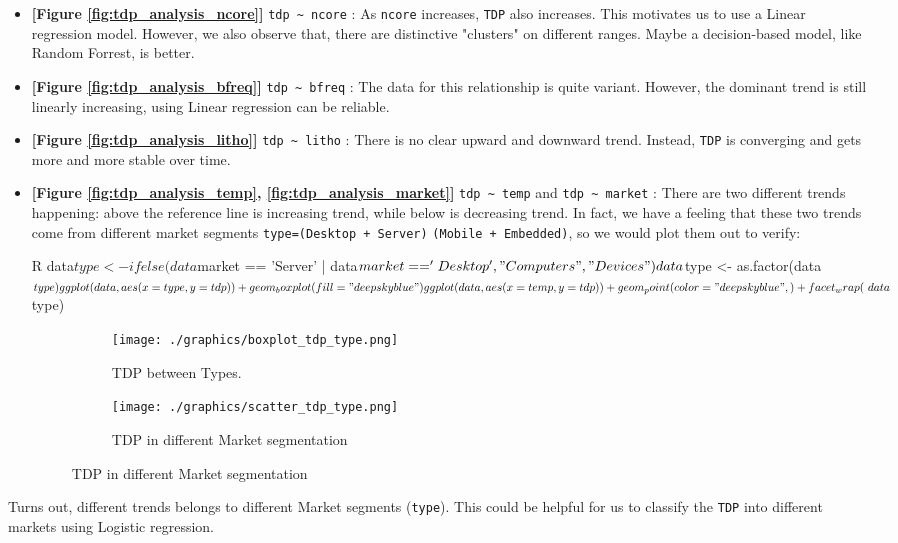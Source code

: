 \begin{itemize}
    \item \textbf{[Figure \ref{fig:tdp_analysis_ncore}]} \verb|tdp ~ ncore| : As \verb|ncore| increases, \verb|TDP| also increases. This motivates us to use 
    a Linear regression model. However, we also observe that, there are distinctive "clusters" on different ranges. Maybe a decision-based model, like Random Forrest,
    is better.
    
    \item \textbf{[Figure \ref{fig:tdp_analysis_bfreq}]} \verb|tdp ~ bfreq| : The data for this relationship is quite variant. However, the dominant trend is still linearly increasing,
    using Linear regression can be reliable.
    
    \item \textbf{[Figure \ref{fig:tdp_analysis_litho}]} \verb|tdp ~ litho| : There is no clear upward and downward trend. Instead, \verb|TDP| is converging and gets more and more stable over time. 
    
    \item \textbf{[Figure \ref{fig:tdp_analysis_temp}, \ref{fig:tdp_analysis_market}]} \verb|tdp ~ temp| and \verb|tdp ~ market| : There are two different trends happening: 
    above the reference line is increasing trend, while below is decreasing trend. In fact, we have a feeling that these two trends come from 
    different market segments \verb|type=(Desktop + Server)| \verb|(Mobile + Embedded)|, so we would plot them out to verify:

        \begin{code}{R}
data$type <- ifelse(data$market == 'Server' | data$market == 'Desktop', "Computers", "Devices")
data$type <- as.factor(data$type)

ggplot(data, aes(x = type, y = tdp)) +
    geom_boxplot(fill = "deepskyblue")
            
ggplot(data, aes(x = temp, y = tdp)) +
    geom_point(color = "deepskyblue", ) +
facet_wrap(~data$type)
        \end{code}

        \begin{figure}[H]
            \centering
            \begin{subfigure}[]{0.4\textwidth}
                \texttt{[image: ./graphics/boxplot\_tdp\_type.png]}
                \caption{TDP between Types.}
            \end{subfigure}
            \begin{subfigure}[]{0.4\textwidth}
                \texttt{[image: ./graphics/scatter\_tdp\_type.png]}
                \caption{TDP in different Market segmentation}
            \end{subfigure}
        \end{figure}
        \end{itemize}
        
Turns out, different trends belongs to different Market segments (\verb|type|). This could be helpful for us to classify the \verb|TDP| into different markets using Logistic regression.
